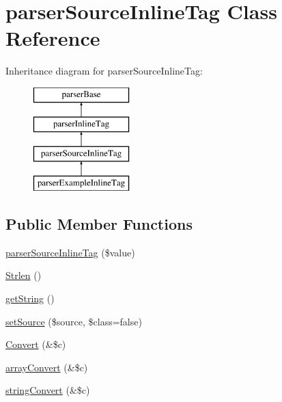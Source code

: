 \hypertarget{classparser_source_inline_tag}{\section{parser\-Source\-Inline\-Tag \-Class \-Reference}
\label{classparser_source_inline_tag}
}
\-Inheritance diagram for parser\-Source\-Inline\-Tag\-:\begin{figure}[H]
\begin{center}
\leavevmode
\includegraphics[height=4.000000cm]{classparser_source_inline_tag}
\end{center}
\end{figure}
\subsection*{\-Public \-Member \-Functions}
\begin{DoxyCompactItemize}
\item 
\hyperlink{classparser_source_inline_tag_aa78a3a6df4ff89162089c24698bb3c95}{parser\-Source\-Inline\-Tag} (\$value)
\item 
\hyperlink{classparser_source_inline_tag_a92d09a6e9b43c6fde4e695c0decc73cd}{\-Strlen} ()
\item 
\hyperlink{classparser_source_inline_tag_afde980915cc78c408e6ac75b662e631c}{get\-String} ()
\item 
\hyperlink{classparser_source_inline_tag_ae0f8c008fd80913cb81e2dc4ee0d6dc6}{set\-Source} (\$source, \$class=false)
\item 
\hyperlink{classparser_source_inline_tag_ad6c06bea9d11cc1c362b592306cfa707}{\-Convert} (\&\$c)
\item 
\hyperlink{classparser_source_inline_tag_ad6a7a831f5306b7129955f7bcdcb7173}{array\-Convert} (\&\$c)
\item 
\hyperlink{classparser_source_inline_tag_a529ef3472bff486827be8a9028d9ab96}{string\-Convert} (\&\$c)
\end{DoxyCompactItemize}
